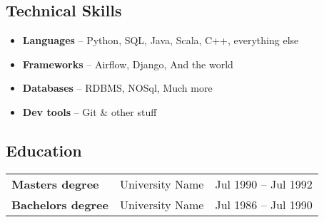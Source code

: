 \documentclass[letterpaper,10pt]{article}
\begin{document}
\subsection*{Technical Skills}
\label{sec:orga7f3b31}
\begin{itemize}
\item \textbf{Languages}  -- Python, SQL, Java, Scala, C++, everything else
\item \textbf{Frameworks} -- Airflow, Django, And the world
\item \textbf{Databases}  -- RDBMS, NOSql, Much more
\item \textbf{Dev tools}  -- Git \& other stuff
\end{itemize}
\subsection*{Education}
\label{sec:org10bea61}
\begin{center}
\begin{tabular}{L{0.27\textwidth}C{0.40\textwidth}R{0.25\textwidth}}
\textbf{Masters degree} & University Name & Jul 1990 -- Jul 1992\\
\textbf{Bachelors degree} & University Name & Jul 1986 -- Jul 1990\\
\end{tabular}
\end{center}
\end{document}
